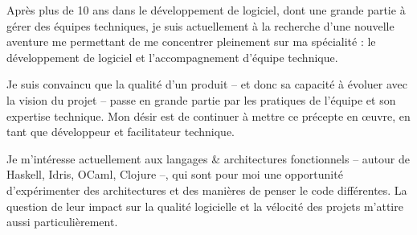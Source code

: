 

\begin{cvparagraph}

Après plus de 10 ans dans le développement de logiciel, dont une grande partie à gérer des équipes techniques, je suis actuellement à la recherche d'une nouvelle aventure me permettant de me concentrer pleinement sur ma spécialité : le développement de logiciel et l'accompagnement d'équipe technique.

Je suis convaincu que la qualité d'un produit -- et donc sa capacité à évoluer avec la vision du projet -- passe en grande partie par les pratiques de l'équipe et son expertise technique. Mon désir est de continuer à mettre ce précepte en \oe{}uvre, en tant que développeur et facilitateur technique.

Je m'intéresse actuellement aux langages \& architectures fonctionnels -- autour de Haskell, Idris, OCaml, Clojure --, qui sont pour moi une opportunité d'expérimenter des architectures et des manières de penser le code différentes. La question de leur impact sur la qualité logicielle et la vélocité des projets m'attire aussi particulièrement.

\end{cvparagraph}
